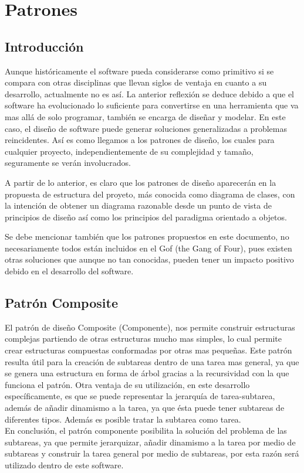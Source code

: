 \chapter{Patrones}
\section{Introducción}
Aunque históricamente el software pueda considerarse como primitivo si se compara con otras disciplinas que llevan siglos de ventaja en cuanto a su desarrollo, actualmente no es así. La anterior reflexión se deduce debido a que el software ha evolucionado lo suficiente para convertirse en una herramienta que va mas allá de solo programar, también se encarga de diseñar y modelar. En este caso, el diseño de software puede generar soluciones generalizadas a problemas reincidentes. Así es como llegamos a los patrones de diseño, los cuales para cualquier proyecto, independientemente de su complejidad y tamaño, seguramente se verán involucrados.

A partir de lo anterior, es claro que los patrones de diseño aparecerán en la propuesta de estructura del proyeto, más conocida como diagrama de clases, con la intención de obtener un diagrama razonable desde un punto de vista de principios de diseño así como los principios del paradigma orientado a objetos. 

Se debe mencionar también que los patrones propuestos en este documento, no necesariamente todos están incluidos en el Gof (the Gang of Four), pues existen otras soluciones que aunque no tan conocidas, pueden tener un impacto positivo debido en el desarrollo del software.
\newpage

\section{Patrón Composite}
El patrón de diseño Composite (Componente), nos permite construir estructuras complejas partiendo de otras estructuras mucho mas simples, lo cual permite crear estructuras compuestas conformadas por otras mas pequeñas. Este patrón resulta útil para la creación de subtareas dentro de una tarea mas general, ya que se genera una estructura en forma de árbol gracias a la recursividad con la que funciona el patrón. Otra ventaja de su utilización, en este desarrollo específicamente,  es que se puede representar la jerarquía de tarea-subtarea, además de añadir dinamismo a la tarea, ya que ésta puede tener subtareas de diferentes tipos. Además es posible tratar la subtarea como tarea.
\\
En conclusión, el patrón componente posibilita la solución del problema de las subtareas, ya que permite jerarquizar, añadir dinamismo a la tarea por medio de subtareas y construir la tarea general por medio de subtareas, por esta razón será utilizado dentro de este software.

